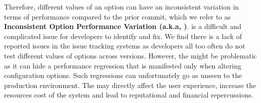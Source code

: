 Therefore, different values of an option can have an inconsistent variation in terms of performance compared to the prior commit, which %
we refer to as \textbf{Inconsistent Option Performance Variation (a.k.a, \inconsistent)}. 
\inconsistent is a difficult and complicated issue for developers to identify and fix. We find there is a lack of reported \inconsistent issues in the issue tracking systems as developers all too often do not test different values of options across versions. However, the \inconsistent might be problematic as it can hide a performance regression that is manifested only when altering configuration options. %
Such regressions can unfortunately go as unseen to the production environment. The \inconsistent may directly affect the user experience, increase the resources cost of the system and lead to reputational and financial repercussions. 


